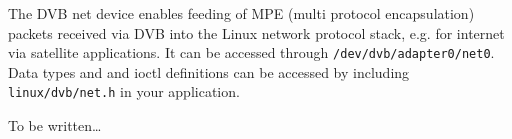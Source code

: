 
The DVB net device enables feeding of MPE (multi protocol
encapsulation) packets received via DVB into the Linux network
protocol stack, e.g. for internet via satellite applications.
It can be accessed through \texttt{/dev/dvb/adapter0/net0}.
Data types and and ioctl definitions can be accessed by including
\texttt{linux/dvb/net.h} in your application.



To be written\dots


